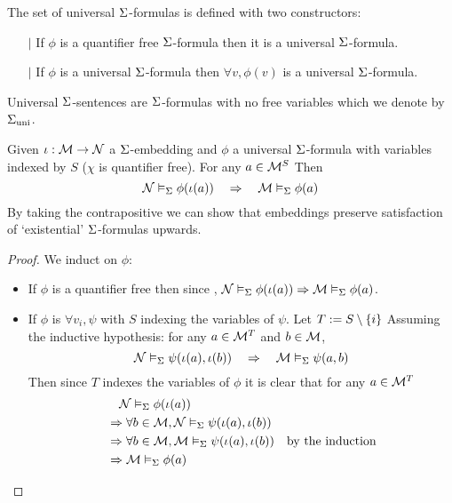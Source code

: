 \begin{dfn}
    The set of universal $\Sigma$-formulas
    is defined with two constructors:
    \begin{itemize}
        \item[$\vert$] If $\phi$ is a quantifier free $\Sigma$-formula 
        then it is a universal $\Sigma$-formula.
        \item[$\vert$] If $\phi$ is a universal $\Sigma$-formula then
        $\forall v, \phi(v)$ is a universal $\Sigma$-formula.
    \end{itemize}
    Universal $\Sigma$-sentences are $\Sigma$-formulas with no free variables
    which we denote by ${\Sigma}_\mathrm{uni}$.
\end{dfn}

\begin{prop}
    Given $\iota : \mathcal{M} \to \mathcal{N}$ a $\Sigma$-embedding and
    $\phi$ a universal $\Sigma$-formula with 
    variables indexed by $S$ ($\chi$ is quantifier free).
    For any $a \in \mathcal{M}^S$
    Then 
    \[
        \mathcal{N} \vDash_{\Sigma} \phi(\iota(a)) \quad \Rightarrow \quad
        \mathcal{M} \vDash_{\Sigma} \phi(a)
    \]
    By taking the contrapositive we can show that embeddings
    preserve satisfaction of `existential' $\Sigma$-formulas upwards.
\end{prop}
\begin{proof}
    We induct on $\phi$:
    \begin{itemize}
        \item If $\phi$ is a quantifier free then since 
        , 
        $\mathcal{N} \vDash_{\Sigma} \phi(\iota(a)) \Rightarrow
        \mathcal{M} \vDash_{\Sigma} \phi(a)$.
        \item If $\phi$ is $\forall v_i, \psi$ with $S$ indexing the variables
        of $\psi$. 
        Let $T := S \setminus \left\{i\right\}$
        Assuming the inductive hypothesis: 
        for any $a \in {\mathcal{M}}^T$ and 
        $b \in {\mathcal{M}}$,
        \[\mathcal{N} \vDash_{\Sigma} \psi(\iota(a),\iota(b)) \quad \Rightarrow \quad
        \mathcal{M} \vDash_{\Sigma} \psi(a,b)\]
        Then since $T$ indexes the variables of $\phi$ it is clear that
        for any $a \in {\mathcal{M}}^T$
        \begin{align*}
            &\quad \mathcal{N} \vDash_{\Sigma} \phi(\iota(a))\\
            &\Rightarrow \forall b \in {\mathcal{M}}, 
            \mathcal{N} \vDash_{\Sigma} \psi(\iota(a),\iota(b)) \\
            &\Rightarrow \forall b \in {\mathcal{M}}, 
            \mathcal{M} \vDash_{\Sigma} \psi(\iota(a),\iota(b)) & \text{by the induction}\\
            &\Rightarrow \mathcal{M} \vDash_{\Sigma} \phi(a)
        \end{align*}
    \end{itemize}
\end{proof}

